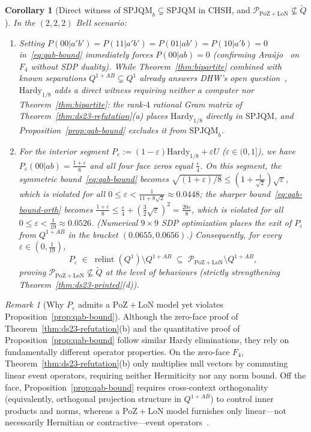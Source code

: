 \documentclass[11pt,a4paper]{article}
\newtheorem{corollary}[theorem]{Corollary}
\theoremstyle{definition}
\theoremstyle{remark}
\newtheorem{remark}[theorem]{Remark}
\newcommand{\SPJQM}{\mathrm{SPJQM}}
\newcommand{\SPJQMb}{\mathrm{SPJQM}_b}
\newcommand{\Qone}{Q^{1}}
\newcommand{\QAB}{Q^{1+AB}}
\newcommand{\tQ}{\widetilde{Q}}
\newcommand{\PoZ}{\mathrm{PoZ}}
\newcommand{\LoN}{\mathrm{LoN}}
\newcommand{\PPoZ}{\mathcal{P}_{\PoZ+\LoN}}
\newcommand{\relint}{\operatorname{relint}}
\begin{document}
\begin{corollary}[Direct witness of $\SPJQMb \subsetneq \SPJQM$ in CHSH, and $\PPoZ \not\subseteq \tQ$]
\label{cor:poz-not-aq}
In the $(2,2,2)$ Bell scenario:
\begin{enumerate}[label=(\alph*),nosep]
\item Setting $P(00|a'b') = P(11|a'b') = P(01|ab') = P(10|a'b) = 0$ in~\eqref{eq:qab-bound} immediately forces $P(00|ab) = 0$ (confirming Ara\'ujo~\cite{Araujo2023} on $F_4$ without SDP duality). While Theorem~\ref{thm:bipartite} combined with known separations $\QAB \subsetneq \Qone$ already answers DHW's open question~\cite[L1166--1168]{DHW2014}, $\mathrm{Hardy}_{1/8}$ adds a direct witness requiring neither a computer nor Theorem~\ref{thm:bipartite}: the rank-$4$ rational Gram matrix of Theorem~\ref{thm:ds23-refutation}(a) places $\mathrm{Hardy}_{1/8}$ directly in $\SPJQM$, and Proposition~\ref{prop:qab-bound} excludes it from $\SPJQMb$.
\item For the interior segment $P_\varepsilon := (1-\varepsilon)\mathrm{Hardy}_{1/8} + \varepsilon U$ ($\varepsilon \in (0, 1]$), we have $P_\varepsilon(00|ab) = \tfrac{1+\varepsilon}{8}$ and all four face zeros equal $\tfrac{\varepsilon}{4}$. On this segment, the symmetric bound~\eqref{eq:qab-bound} becomes $\sqrt{(1+\varepsilon)/8} \le (1 + \tfrac{1}{\sqrt{2}})\sqrt{\varepsilon}$, which is violated for all $0 \le \varepsilon < \frac{1}{11+8\sqrt{2}} \approx 0.0448$; the sharper bound~\eqref{eq:qab-bound-orth} becomes $\tfrac{1+\varepsilon}{8} \le \tfrac{\varepsilon}{4} + (\tfrac{3}{2}\sqrt{\varepsilon})^2 = \tfrac{20\varepsilon}{8}$, which is violated for all $0 \le \varepsilon < \tfrac{1}{19} \approx 0.0526$. (Numerical $9 \times 9$ SDP optimization places the exit of $P_\varepsilon$ from $\QAB$ in the bracket $(0.0655, 0.0656)$.) Consequently, for every $\varepsilon \in (0, \tfrac{1}{19})$,
\[
P_\varepsilon \;\in\; \relint(\Qone) \setminus \QAB \;\subseteq\; \PPoZ \setminus \QAB,
\]
proving $\PPoZ \not\subseteq \tQ$ at the level of behaviours (strictly strengthening Theorem~\ref{thm:ds23-printed}(d)).
\end{enumerate}
\end{corollary}

\begin{remark}[Why $P_\varepsilon$ admits a $\PoZ+\LoN$ model yet violates Proposition~\ref{prop:qab-bound}]
\label{rem:poz-vs-qab}
Although the zero-face proof of Theorem~\ref{thm:ds23-refutation}(b) and the quantitative proof of Proposition~\ref{prop:qab-bound} follow similar Hardy eliminations, they rely on fundamentally different operator properties. On the zero-face $F_4$, Theorem~\ref{thm:ds23-refutation}(b) only multiplies null vectors by commuting linear event operators, requiring neither Hermiticity nor any norm bound. Off the face, Proposition~\ref{prop:qab-bound} requires cross-context orthogonality (equivalently, orthogonal projection structure in $\QAB$) to control inner products and norms, whereas a $\PoZ+\LoN$ model furnishes only linear---not necessarily Hermitian or contractive---event operators~\cite[L1195]{DowkerSorkin2023}.
\end{remark}
\end{document}
